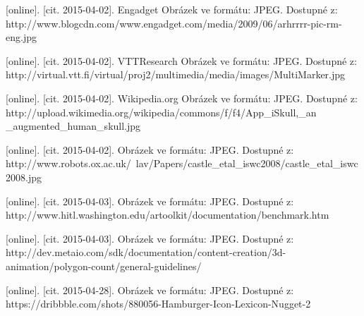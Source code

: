 \documentclass[twoside,12pt]{article}
\begin{document}
\begin{literatura}
{
	[online]. [cit. 2015-04-02]. Engadget
	Obrázek ve formátu: JPEG. Dostupné z: http://www.blogcdn.com/www.engadget.com/media/2009/06/arhrrrr-pic-rm-eng.jpg
}

{
	[online]. [cit. 2015-04-02]. VTTResearch
	Obrázek ve formátu: JPEG. Dostupné z: http://virtual.vtt.fi/virtual/proj2/multimedia/media/images/MultiMarker.jpg
}

{
	[online]. [cit. 2015-04-02]. Wikipedia.org
	Obrázek ve formátu: JPEG. Dostupné z: http://upload.wikimedia.org/wikipedia/commons/f/f4/App\_iSkull,\_an \_augmented\_human\_skull.jpg
}

{
	[online]. [cit. 2015-04-02]. 
	Obrázek ve formátu: JPEG. Dostupné z: http://www.robots.ox.ac.uk/~lav/Papers/castle\_etal\_iswc2008/castle\_etal\_iswc2008.jpg
}

{
	[online]. [cit. 2015-04-03]. 
	Obrázek ve formátu: JPEG. Dostupné z: http://www.hitl.washington.edu/artoolkit/documentation/benchmark.htm
}

{
	[online]. [cit. 2015-04-03]. 
	Obrázek ve formátu: JPEG. Dostupné z: http://dev.metaio.com/sdk/documentation/content-creation/3d-animation/polygon-count/general-guidelines/
}

{
	[online]. [cit. 2015-04-28]. 
	Obrázek ve formátu: JPEG. Dostupné z: https://dribbble.com/shots/880056-Hamburger-Icon-Lexicon-Nugget-2
}


%




\end{literatura}
\end{document}
